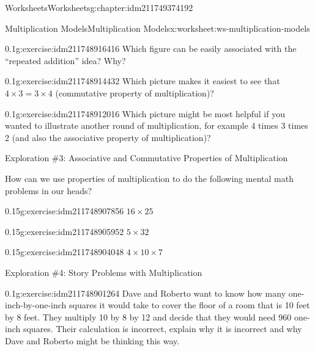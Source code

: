 \documentclass[twoside,11pt,]{book}
\begin{document}
\begin{chapterptx}{Worksheets}{}{Worksheets}{}{}{g:chapter:idm211749374192}
\begin{worksheet-section-numberless}{Multiplication Models}{}{Multiplication Models}{}{}{x:worksheet:ws-multiplication-models}
\begin{introduction}{}
\begin{description}
\begin{sidebyside}{1}{0.3}{0.3}{0}
\begin{sbspanel}{0.4}
\end{sbspanel}%
\end{sidebyside}%
\end{description}
\end{introduction}%
\begin{divisionexercise}{5}{}{0.1}{g:exercise:idm211748916416}%
Which figure can be easily associated with the ``repeated addition'' idea? Why?%
\end{divisionexercise}%
\begin{divisionexercise}{6}{}{0.1}{g:exercise:idm211748914432}%
Which picture makes it easiest to see that \(4 \times 3 = 3 \times 4 \) (commutative property of multiplication)?%
\end{divisionexercise}%
\begin{divisionexercise}{7}{}{0.1}{g:exercise:idm211748912016}%
Which picture might be most helpful if you wanted to illustrate another round of multiplication, for example 4 times 3 times 2 (and also the associative property of multiplication)?%
\end{divisionexercise}%
\clearpage
\begin{introduction}{}%
Exploration \#3: Associative and Commutative Properties of Multiplication%
\par
How can we use properties of multiplication to do the following mental math problems in our heads?%
\end{introduction}%
\begin{divisionexercise}{8}{}{0.15}{g:exercise:idm211748907856}%
\(16 \times 25  \)%
\end{divisionexercise}%
\begin{divisionexercise}{9}{}{0.15}{g:exercise:idm211748905952}%
\(5 \times 32  \)%
\end{divisionexercise}%
\begin{divisionexercise}{10}{}{0.15}{g:exercise:idm211748904048}%
\(4 \times 10 \times 7  \)%
\end{divisionexercise}%
\begin{introduction}{}%
Exploration \#4: Story Problems with Multiplication\end{introduction}%
\begin{divisionexercise}{11}{}{0.1}{g:exercise:idm211748901264}%
Dave and Roberto want to know how many one-inch-by-one-inch squares it would take to cover the floor of a room that is 10 feet by 8 feet.  They multiply 10 by 8 by 12 and decide that they would need 960 one-inch squares.  Their calculation is incorrect, explain why it is incorrect and why Dave and Roberto might be thinking this way.%

\end{divisionexercise}
\end{worksheet-section-numberless}
\end{chapterptx}
\end{document}
